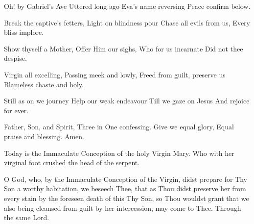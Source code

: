 {{\item Oh! by Gabriel's Ave
Uttered long ago
Eva's name reversing
Peace confirm below.

\item Break the captive's fetters,
Light on blindness pour
Chase all evils from us,
Every bliss implore.

\item Show thyself a Mother,
Offer Him our sighs,
Who for us incarnate
Did not thee despise.

\item Virgin all excelling,
Passing meek and lowly,
Freed from guilt, preserve us
Blameless chaste and holy.

\item Still as on we journey
Help our weak endeavour
Till we gaze on Jesus
And rejoice for ever.

\item Father, Son, and Spirit,
Three in One confessing.
Give we equal glory,
Equal praise and blessing.
Amen.%
}

{
\def\vrlinebreak{T}
{Today is the Immaculate Conception of the holy Virgin Mary.}
{Who with her virginal foot crushed the head of the serpent.}
}

\bigskip
{
\newcommand{\anttranslation}{This day a rod came forth from the root of Jesse: this day Mary was conceived without any stain of sin: this day the head of the old serpent was crushed by her.  Alleluia.}
\def\breakbeforeEuouae{T}
\def\noeuouae{T}
\def\preverses{\greblockcustos}
\def\dontrepeatantiphon{T}
}
{O God, who, by the Immaculate Conception of the Virgin, didst prepare for Thy Son a worthy habitation, we beseech Thee, that as Thou didst preserve her from every stain by the foreseen death of this Thy Son, so Thou wouldst grant that we also being cleansed from guilt by her intercession, may come to Thee.  Through the same Lord.}
\bigskip

\bigskip
\noindent
{}
\bigskip
}


